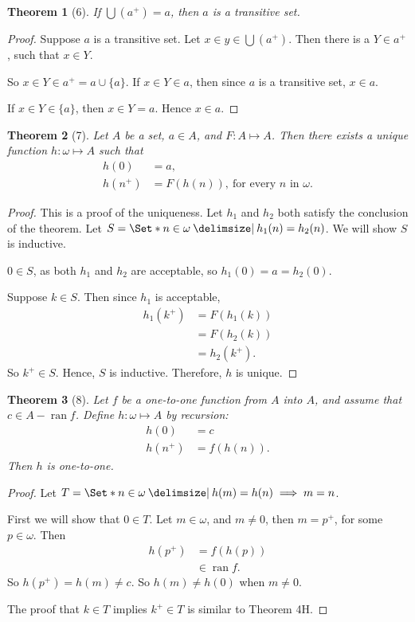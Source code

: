 \documentclass[12pt]{article}
\theoremstyle{plain}
\newtheorem*{exthm}{Theorem}
\theoremstyle{remark}
\theoremstyle{definition}
\theoremstyle{remark}
\providecommand\st{}
\newcommand\SetSymbol[1][]{%
  \nonscript\:#1\vert%
  \allowbreak%
  \nonscript\:
\mathopen{}}
\renewcommand\st{\SetSymbol[\delimsize]}
\DeclareMathOperator{\ran}{ran}
\begin{document}
\begin{exthm}[6]
  If $\bigcup(a^+) = a$, then $a$ is a transitive set.
\end{exthm}
\begin{proof}
  Suppose $a$ is a transitive set. Let $x \in y \in \bigcup(a^+)$. Then there is a $Y \in a^+$, such that $x \in Y$.

  So $x \in Y \in a^+ = a \cup \{a\}$. If $x \in Y \in a$, then since $a$ is a transitive set, $x \in a$.

  If $x \in Y \in \{a\}$, then $x \in Y = a$. Hence $x \in a$.
\end{proof}

\begin{exthm}[7]
  Let $A$ be a set, $a \in A$, and $F: A \mapsto A$. Then there exists a unique function $h: \omega \mapsto A$ such that
\begin{align}
  h(0) &= a,\\
  h(n^+) &= F(h(n)), \ \text{for every $n$ in $\omega$.}
  \end{align}
\end{exthm}
\begin{proof}
  This is a proof of the uniqueness. Let $h_1$ and $h_2$ both satisfy the conclusion of the theorem. Let $S = \Set*{n \in \omega \st h_1(n) = h_2(n)}$. We will show $S$ is inductive.

  $0 \in S$, as both $h_1$ and $h_2$ are acceptable, so $h_1(0) = a = h_2(0)$.

  Suppose $k \in S$. Then since $h_1$ is acceptable,
  \begin{align*}
    h_1(k^+) &= F(h_1(k))\\
             &= F(h_2(k))\\
             &= h_2(k^+).
  \end{align*}
  So $k^+ \in S$. Hence, $S$ is inductive. Therefore, $h$ is unique.
\end{proof}

\begin{exthm}[8]
  Let $f$ be a one-to-one function from $A$ into $A$, and assume that $c \in A - \ran{f}$. Define $h: \omega \mapsto A$ by recursion:
  \begin{align*}
    h(0) &= c\\
    h(n^+) &= f(h(n)).
  \end{align*}
  Then $h$ is one-to-one.
\end{exthm}
\begin{proof}
  Let $T = \Set*{n \in \omega \st h(m) = h(n) \implies m = n}$.

  First we will show that $0 \in T$. Let $m \in \omega$, and $m \neq 0$, then $m = p^+$, for some $p \in \omega$. Then
\begin{align*}
  h(p^+) &= f(h(p))\\
         &\in \ran{f}.
\end{align*}
So $h(p^+) = h(m) \neq c$. So $h(m) \neq h(0)$ when $m \neq 0$.

The proof that $k \in T$ implies $k^+ \in T$ is similar to Theorem 4H.
\end{proof}
\end{document}
